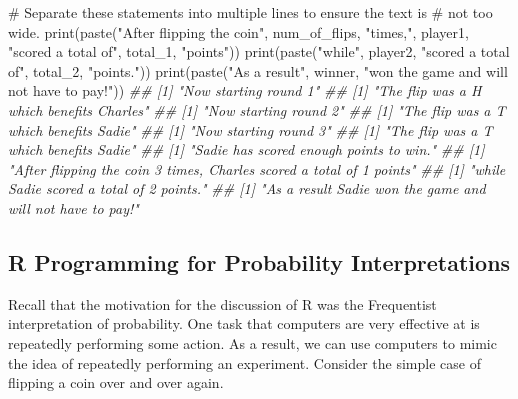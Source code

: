 \documentclass[
  letterpaper,
  DIV=11,
  numbers=noendperiod]{scrreprt}
\newenvironment{Shaded}{\begin{snugshade}}{\end{snugshade}}
\newcommand{\CommentTok}[1]{\textcolor[rgb]{0.37,0.37,0.37}{#1}}
\newcommand{\DocumentationTok}[1]{\textcolor[rgb]{0.37,0.37,0.37}{\textit{#1}}}
\newcommand{\FunctionTok}[1]{\textcolor[rgb]{0.28,0.35,0.67}{#1}}
\newcommand{\NormalTok}[1]{\textcolor[rgb]{0.00,0.23,0.31}{#1}}
\newcommand{\StringTok}[1]{\textcolor[rgb]{0.13,0.47,0.30}{#1}}
\theoremstyle{definition}
\theoremstyle{definition}
\theoremstyle{definition}
\theoremstyle{remark}
\begin{document}
\begin{Shaded}
\begin{Highlighting}[]
\CommentTok{\# Separate these statements into multiple lines to ensure the text is }
\CommentTok{\# not too wide.}
\FunctionTok{print}\NormalTok{(}\FunctionTok{paste}\NormalTok{(}\StringTok{"After flipping the coin"}\NormalTok{, num\_of\_flips, }\StringTok{"times,"}\NormalTok{, player1, }
            \StringTok{"scored a total of"}\NormalTok{, total\_1, }\StringTok{"points"}\NormalTok{))}
\FunctionTok{print}\NormalTok{(}\FunctionTok{paste}\NormalTok{(}\StringTok{"while"}\NormalTok{, player2, }\StringTok{"scored a total of"}\NormalTok{, total\_2, }\StringTok{"points."}\NormalTok{))}
\FunctionTok{print}\NormalTok{(}\FunctionTok{paste}\NormalTok{(}\StringTok{"As a result"}\NormalTok{, winner, }\StringTok{"won the game and will not have to pay!"}\NormalTok{))}
\DocumentationTok{\#\# [1] "Now starting round 1"}
\DocumentationTok{\#\# [1] "The flip was a H which benefits Charles"}
\DocumentationTok{\#\# [1] "Now starting round 2"}
\DocumentationTok{\#\# [1] "The flip was a T which benefits Sadie"}
\DocumentationTok{\#\# [1] "Now starting round 3"}
\DocumentationTok{\#\# [1] "The flip was a T which benefits Sadie"}
\DocumentationTok{\#\# [1] "Sadie has scored enough points to win."}
\DocumentationTok{\#\# [1] "After flipping the coin 3 times, Charles scored a total of 1 points"}
\DocumentationTok{\#\# [1] "while Sadie scored a total of 2 points."}
\DocumentationTok{\#\# [1] "As a result Sadie won the game and will not have to pay!"}
\end{Highlighting}
\end{Shaded}

\subsection{R Programming for Probability
Interpretations}\label{r-programming-for-probability-interpretations}

Recall that the motivation for the discussion of R was the Frequentist
interpretation of probability. One task that computers are very
effective at is repeatedly performing some action. As a result, we can
use computers to mimic the idea of repeatedly performing an experiment.
Consider the simple case of flipping a coin over and over again.
\end{document}
